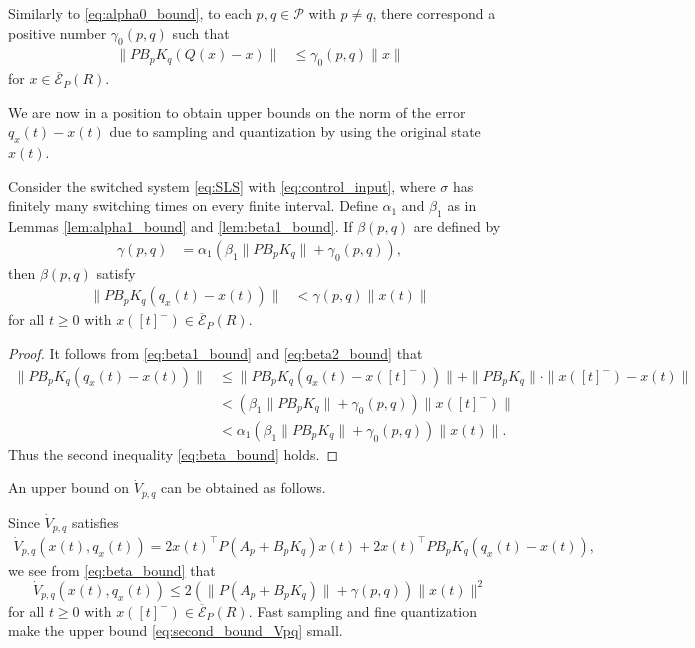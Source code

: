 \documentclass[a4, 11pt]{article}
\begin{document}
Similarly to \eqref{eq:alpha0_bound},
to each $p,q \in \mathcal{P}$ with $p\not=q$, 
there correspond a positive number
$\gamma_0(p,q)$ such that
\begin{align}
\label{eq:beta2_bound}
\|PB_pK_q(Q(x) - x)\| &\leq \gamma_0(p,q) \|x\|
\end{align}
for $x \in
\overline{\mathcal{E}}_P(R)$.

We are now in a position to obtain upper bounds on
the norm of  
the error 
$q_x(t) - x(t)$ due to
sampling and quantization by using
the original state $x(t)$.
\begin{theorem}
\label{thm:alpha_beta_bound}
Consider the switched system \eqref{eq:SLS} with \eqref{eq:control_input}, 
where $\sigma$ has finitely many switching times
on every finite interval.
Define $\alpha_1$ and $\beta_1$ as in Lemmas 
\ref{lem:alpha1_bound} and \ref{lem:beta1_bound}.
If $\beta(p,q)$ are defined by
\begin{align*}
\gamma(p,q) &= \alpha_1 (\beta_1\|PB_pK_q\|  + \gamma_0(p,q)),
\end{align*}
then $\beta(p,q)$ satisfy
\begin{align}
\|PB_pK_q(q_x(t) - x(t))\| &< \gamma(p,q)\|x(t)\| \label{eq:beta_bound}
\end{align}
for all $t \geq 0$ with 
$x([t]^-) \in
\overline{\mathcal{E}}_P(R)$.
\end{theorem}
\begin{proof}
It follows from \eqref{eq:beta1_bound} and \eqref{eq:beta2_bound} that
\begin{align*}
\|PB_pK_q(q_x(t) - x(t))\| 
&\leq 
\|PB_pK_q(q_x(t) - x([t]^-)) \|  + \|PB_pK_q\|\cdot\| x([t]^-) - x(t) \| \\
&<
(\beta_1\|PB_pK_q\| + \gamma_0(p,q)) \|x([t]^-)\| \\
&< \alpha_1 (\beta_1\|PB_pK_q\| + \gamma_0(p,q))\|x(t)\|.
\end{align*}
Thus the second inequality \eqref{eq:beta_bound} holds.
\end{proof}

An upper bound on $\dot V_{p,q}$
can be obtained as follows.



Since $\dot V_{p,q}$ satisfies
\begin{align*}
\dot V_{p,q}(x(t),q_x(t)) 
=
2x(t)^{\top}P(A_p + B_pK_q)x(t) +
2x(t)^{\top}PB_pK_q(q_x(t) - x(t)),
\end{align*}
we see from \eqref{eq:beta_bound} that
\begin{equation}
\label{eq:second_bound_Vpq}
\dot V_{p,q}(x(t),q_x(t)) \leq
2(\|P(A_p + B_pK_q) \| + \gamma(p,q) ) \|x(t)\|^2
\end{equation}
for all $t \geq 0$ with 
$x([t]^-) \in
\overline{\mathcal{E}}_P(R)$.
Fast sampling and fine quantization make
the upper bound \eqref{eq:second_bound_Vpq} small.
\end{document}
